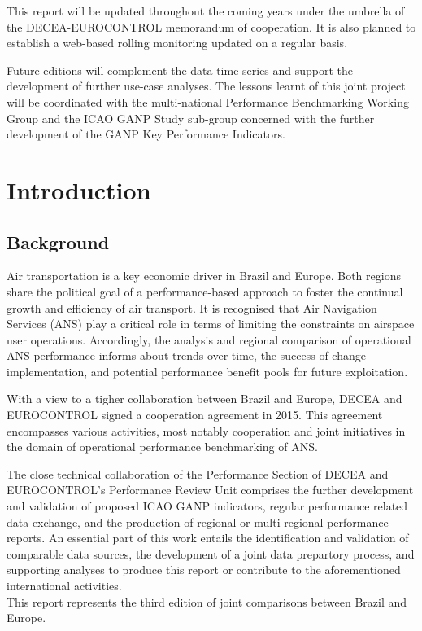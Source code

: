 \documentclass[
  a4paper,
  DIV=11,
  numbers=noendperiod]{scrreport}
\begin{document}
This report will be updated throughout the coming years under the
umbrella of the DECEA-EUROCONTROL memorandum of cooperation. It is also
planned to establish a web-based rolling monitoring updated on a regular
basis.

Future editions will complement the data time series and support the
development of further use-case analyses. The lessons learnt of this
joint project will be coordinated with the multi-national Performance
Benchmarking Working Group and the ICAO GANP Study sub-group concerned
with the further development of the GANP Key Performance Indicators.


\hypertarget{introduction}{%
\chapter{Introduction}\label{introduction}}

{}
\setcounter{page}{1}

\hypertarget{background}{%
\section{Background}\label{background}}

Air transportation is a key economic driver in Brazil and Europe. Both
regions share the political goal of a performance-based approach to
foster the continual growth and efficiency of air transport. It is
recognised that Air Navigation Services (ANS) play a critical role in
terms of limiting the constraints on airspace user operations.
Accordingly, the analysis and regional comparison of operational ANS
performance informs about trends over time, the success of change
implementation, and potential performance benefit pools for future
exploitation.

With a view to a tigher collaboration between Brazil and Europe, DECEA
and EUROCONTROL signed a cooperation agreement in 2015. This agreement
encompasses various activities, most notably cooperation and joint
initiatives in the domain of operational performance benchmarking of
ANS.

The close technical collaboration of the Performance Section of DECEA
and EUROCONTROL's Performance Review Unit comprises the further
development and validation of proposed ICAO GANP indicators, regular
performance related data exchange, and the production of regional or
multi-regional performance reports. An essential part of this work
entails the identification and validation of comparable data sources,
the development of a joint data prepartory process, and supporting
analyses to produce this report or contribute to the aforementioned
international activities.\\
This report represents the third edition of joint comparisons between
Brazil and Europe.
\end{document}
